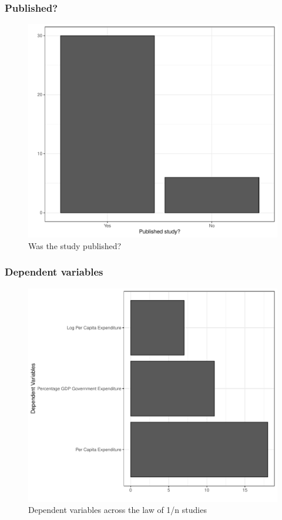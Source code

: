 \documentclass[
]{article}
\begin{document}
\newpage

\hypertarget{published}{%
\subsubsection{Published?}\label{published}}

\begin{figure}
\centering
\includegraphics{appendixV5_files/figure-latex/unnamed-chunk-3-1.pdf}
\caption{Was the study published?}
\end{figure}

\newpage

\hypertarget{dependent-variables}{%
\subsubsection{Dependent variables}\label{dependent-variables}}

\begin{figure}
\centering
\includegraphics{appendixV5_files/figure-latex/unnamed-chunk-4-1.pdf}
\caption{Dependent variables across the law of 1/n studies}
\end{figure}
\end{document}
